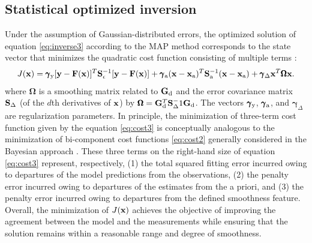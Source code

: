 \subsection{Statistical optimized inversion}
\label{subsec:alg-inv}

Under the assumption of Gaussian-distributed errors, the optimized
solution of equation \eqref{eq:inverse3} according to the 
MAP method corresponds to the state vector that minimizes the quadratic cost
function consisting of multiple terms \citep{Dubovik00a, Dubovik04}:
\begin{equation}
J(\mathbf{x}) = \pmb{\gamma}_\text{y}[\mathbf{y}-\mathbf{F}(\mathbf{x})]^T\mathbf{S}_\epsilon^{-1}[\mathbf{y}-\mathbf{F}(\mathbf{x})] +
          \pmb{\gamma}_\text{a}(\mathbf{x}-\mathbf{x}_\text{a})^T\mathbf{S}_\text{a}^{-1}(\mathbf{x}-\mathbf{x}_\text{a}) +
          \pmb{\gamma}_\Delta\mathbf{x}^T\pmb{\Omega}\mathbf{x}.
\label{eq:cost3}
\end{equation}
where $\pmb{\Omega}$ is a smoothing matrix related to $\mathbf{G}_\text{d}$ and the 
error covariance matrix $\mathbf{S}_\Delta$ (of the $d$th derivatives of
$\mathbf{x}$) by $\pmb{\Omega}=\mathbf{G}_\text{d}^T\mathbf{S}_\Delta^-1\mathbf{G}_\text{d}$. The
vectors $\pmb{\gamma}_\text{y}$, $\pmb{\gamma}_\text{a}$, and 
$\pmb{\gamma}_\Delta$ are regularization parameters. In principle,
the minimization of three-term cost function given by the equation
\eqref{eq:cost3} is conceptually analogous to the minimization of 
bi-component cost functions \eqref{eq:cost2} generally considered 
in the Bayesian approach \citep{Rodgers00}. These three terms on the 
right-hand size of equation \eqref{eq:cost3} represent,
respectively, (1) the total squared fitting error incurred owing to
departures of the model predictions from the observations, (2) the
penalty error incurred owing to departures of the estimates from the a
priori, and (3) the penalty error incurred owing to departures from the
defined smoothness feature. Overall, the minimization of $J(\mathbf{x})$ achieves
the objective of improving the agreement between the model and the
measurements while ensuring that the solution remains within a
reasonable range and degree of smoothness. 

